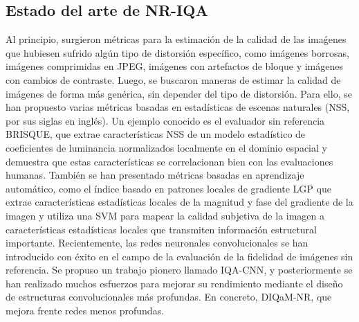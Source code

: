 \subsection{Estado del arte de NR-IQA}
Al principio, surgieron métricas para la estimación de la calidad de las imaǵenes 
que hubiesen sufrido algún tipo de distorsión específico, 
como imágenes borrosas\cite{GradientBasedBlurAssessment}, 
imágenes comprimidas en JPEG\cite{JPEGBasedOnLuminance}, 
imágenes con artefactos de bloque\cite{DeblockedImages} y imágenes con cambios de contraste\cite{ContrastDistorted}.
Luego, se buscaron maneras de estimar la calidad de imágenes de forma más genérica, 
sin depender del tipo de distorsión. Para ello, se han propuesto varias métricas 
basadas en estadísticas de escenas naturales (NSS, por sus siglas en inglés). 
Un ejemplo conocido es el evaluador sin referencia BRISQUE\cite{BRISQUE}, que extrae 
características NSS de un modelo estadístico de coeficientes de luminancia 
normalizados localmente en el dominio espacial y demuestra que estas características 
se correlacionan bien con las evaluaciones humanas.
También se han presentado métricas basadas en aprendizaje automático, 
como el índice basado en patrones locales de gradiente LGP\cite{LGP} que extrae 
características estadísticas locales de la magnitud y fase del gradiente de la imagen y utiliza una 
SVM para mapear la calidad subjetiva de la imagen a 
características estadísticas locales que transmiten información estructural importante.
Recientemente, las redes neuronales convolucionales se han introducido con 
éxito en el campo de la evaluación de la fidelidad de imágenes sin referencia. 
Se propuso un trabajo pionero llamado IQA-CNN\cite{IQA-CNN}, 
y posteriormente se han realizado muchos esfuerzos para mejorar su rendimiento 
mediante el diseño de estructuras convolucionales más profundas. En concreto,
DIQaM-NR\cite{DIQaM}, que mejora frente redes menos profundas.

